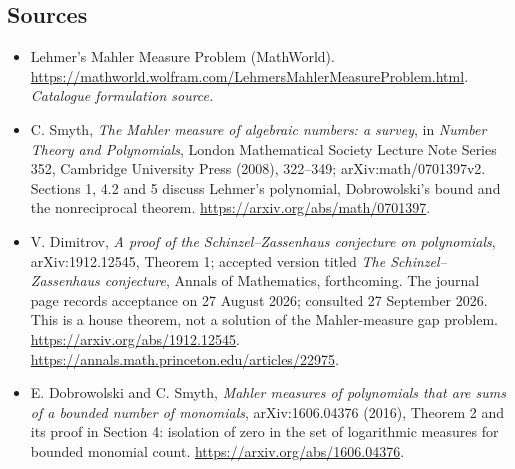 \documentclass[11pt,a4paper]{article}
\begin{document}
\subsection{Sources}
\begin{itemize}\raggedright
\item[\textnormal{[S1]}]\hypertarget{source:statement:1}{} Lehmer's Mahler Measure Problem (MathWorld).
\url{https://mathworld.wolfram.com/LehmersMahlerMeasureProblem.html}.
{\small\textit{Catalogue formulation source.}}
\item[\textnormal{[E1]}]\hypertarget{extra:statement:1}{}
C. Smyth, \emph{The Mahler measure of algebraic numbers: a survey},
in \emph{Number Theory and Polynomials}, London Mathematical Society
Lecture Note Series 352, Cambridge University Press (2008), 322--349;
arXiv:math/0701397v2. Sections 1, 4.2 and 5 discuss Lehmer's polynomial,
Dobrowolski's bound and the nonreciprocal theorem.
\url{https://arxiv.org/abs/math/0701397}.
\item[\textnormal{[E2]}]\hypertarget{extra:statement:2}{}
V. Dimitrov, \emph{A proof of the Schinzel--Zassenhaus conjecture on
polynomials}, arXiv:1912.12545, Theorem 1; accepted version titled
\emph{The Schinzel--Zassenhaus conjecture}, Annals of Mathematics,
forthcoming. The journal page records acceptance on 27 August 2026;
consulted 27 September 2026. This is a house theorem, not a solution
of the Mahler-measure gap problem.
\url{https://arxiv.org/abs/1912.12545}.
\url{https://annals.math.princeton.edu/articles/22975}.
\item[\textnormal{[E3]}]\hypertarget{extra:statement:3}{}
E. Dobrowolski and C. Smyth, \emph{Mahler measures of polynomials that
are sums of a bounded number of monomials}, arXiv:1606.04376 (2016),
Theorem 2 and its proof in Section 4: isolation of zero in the set
of logarithmic measures for bounded monomial count.
\url{https://arxiv.org/abs/1606.04376}.
\end{itemize}
\end{document}
